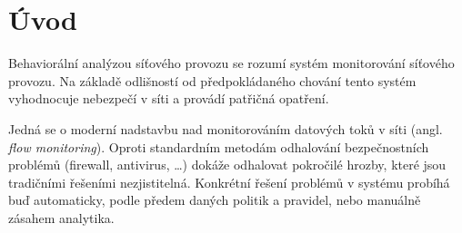 \section{Úvod}

Behaviorální analýzou síťového provozu se rozumí systém monitorování síťového provozu.
Na základě odlišností od předpokládaného chování tento systém vyhodnocuje nebezpečí v síti a provádí patřičná opatření.

Jedná se o moderní nadstavbu nad monitorováním datových toků v síti (angl. \textit{flow monitoring}).
Oproti standardním metodám odhalování bezpečnostních problémů (firewall, antivirus, \dots) dokáže odhalovat pokročilé hrozby, které jsou tradičními řešeními nezjistitelná.
Konkrétní řešení problémů v systému probíhá buď automaticky, podle předem daných politik a pravidel, nebo manuálně zásahem analytika.